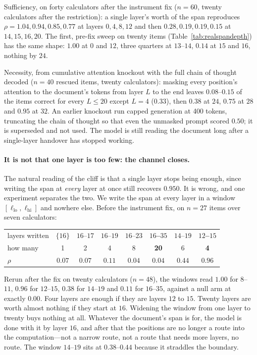 \documentclass{article}
\begin{document}
Sufficiency, on forty calculators after the instrument fix ($n=60$, twenty
calculators after the restriction): a single layer's worth of the span reproduces
$\rho = 1.04, 0.94, 0.85, 0.77$ at layers $0, 4, 8, 12$ and then
$0.28, 0.19, 0.19, 0.15$ at $14, 15, 16, 20$. The first, pre-fix sweep on twenty
items (Table~\ref{tab:realspandepth}) has the same shape: $1.00$ at $0$ and $12$,
three quarters at $13$--$14$, $0.14$ at $15$ and $16$, nothing by $24$.

Necessity, from cumulative attention knockout with the full chain of thought
decoded ($n=40$ rescued items, twenty calculators): masking every position's
attention to the document's tokens from layer $L$ to the end leaves
$0.08$--$0.15$ of the items correct for every $L \le 20$ except $L=4$ ($0.33$),
then $0.38$ at $24$, $0.75$ at $28$ and $0.95$ at $32$. An earlier knockout run
capped generation at 400 tokens, truncating the chain of thought so that even the
unmasked prompt scored $0.50$; it is superseded and not used. The model is still
reading the document long after a single-layer handover has stopped working.

\paragraph{It is not that one layer is too few: the channel closes.} The
natural reading of the cliff is that a single layer stops being enough, since
writing the span at \emph{every} layer at once still recovers $0.950$. It is
wrong, and one experiment separates the two. We write the span at every layer in
a window $[\ell_{\text{lo}}, \ell_{\text{hi}}]$ and nowhere else. Before the
instrument fix, on $n=27$ items over seven calculators:

\begin{center}
\begin{tabular}{@{}lccccccc@{}}
\toprule
layers written & $\{16\}$ & $16$--$17$ & $16$--$19$ & $16$--$23$ &
\textbf{$16$--$35$} & $14$--$19$ & \textbf{$12$--$15$} \\
how many & 1 & 2 & 4 & 8 & \textbf{20} & 6 & \textbf{4} \\
\midrule
$\rho$ & $0.07$ & $0.07$ & $0.11$ & $0.04$ & $\mathbf{0.04}$ & $0.44$ &
$\mathbf{0.96}$ \\
\bottomrule
\end{tabular}
\end{center}

Rerun after the fix on twenty calculators ($n=48$), the windows read $1.00$ for
$8$--$11$, $0.96$ for $12$--$15$, $0.38$ for $14$--$19$ and $0.11$ for $16$--$35$,
against a null arm at exactly $0.00$. Four layers are enough if they are layers
$12$ to $15$. Twenty layers are worth almost nothing if they start at $16$. Widening the window from one layer to
twenty buys nothing at all. Whatever the document's span is for, the model is
done with it by layer $16$, and after that the positions are no longer a route
into the computation---not a narrow route, not a route that needs more layers,
no route. The window $14$--$19$ sits at $0.38$--$0.44$ because it
straddles the boundary.
\end{document}
